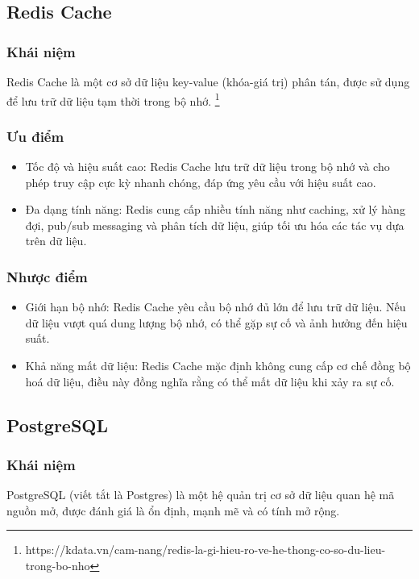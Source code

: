 \subsection{Redis Cache}
\subsubsection{Khái niệm}
\noindent Redis Cache là một cơ sở dữ liệu key-value (khóa-giá trị) phân tán, được sử dụng để lưu trữ dữ liệu tạm thời trong bộ nhớ. \footnote{https://kdata.vn/cam-nang/redis-la-gi-hieu-ro-ve-he-thong-co-so-du-lieu-trong-bo-nho}
\subsubsection{Ưu điểm}
\begin{itemize}
    \item Tốc độ và hiệu suất cao: Redis Cache lưu trữ dữ liệu trong bộ nhớ và cho phép truy cập cực kỳ nhanh chóng, đáp ứng yêu cầu với hiệu suất cao.
    \item Đa dạng tính năng: Redis cung cấp nhiều tính năng như caching, xử lý hàng đợi, pub/sub messaging và phân tích dữ liệu, giúp tối ưu hóa các tác vụ dựa trên dữ liệu.
\end{itemize}
\subsubsection{Nhược điểm}
\begin{itemize}
    \item Giới hạn bộ nhớ: Redis Cache yêu cầu bộ nhớ đủ lớn để lưu trữ dữ liệu. Nếu dữ liệu vượt quá dung lượng bộ nhớ, có thể gặp sự cố và ảnh hưởng đến hiệu suất.
    \item Khả năng mất dữ liệu: Redis Cache mặc định không cung cấp cơ chế đồng bộ hoá dữ liệu, điều này đồng nghĩa rằng có thể mất dữ liệu khi xảy ra sự cố.
\end{itemize}
\subsection{PostgreSQL}
\subsubsection{Khái niệm}
\noindent PostgreSQL (viết tắt là Postgres) là một hệ quản trị cơ sở dữ liệu quan hệ mã nguồn mở, được đánh giá là ổn định, mạnh mẽ và có tính mở rộng.

